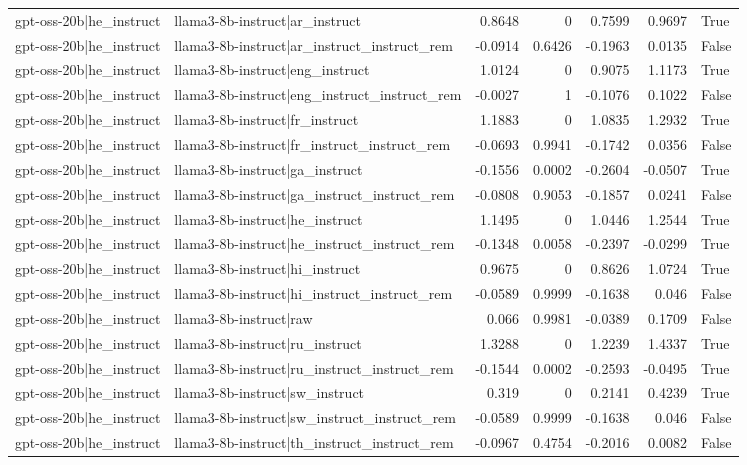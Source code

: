 \begin{table}
\begin{tabular}{l l r r r r l}
gpt-oss-20b|he_instruct & llama3-8b-instruct|ar_instruct & 0.8648 & 0 & 0.7599 & 0.9697 & True \\
gpt-oss-20b|he_instruct & llama3-8b-instruct|ar_instruct_instruct_rem & -0.0914 & 0.6426 & -0.1963 & 0.0135 & False \\
gpt-oss-20b|he_instruct & llama3-8b-instruct|eng_instruct & 1.0124 & 0 & 0.9075 & 1.1173 & True \\
gpt-oss-20b|he_instruct & llama3-8b-instruct|eng_instruct_instruct_rem & -0.0027 & 1 & -0.1076 & 0.1022 & False \\
gpt-oss-20b|he_instruct & llama3-8b-instruct|fr_instruct & 1.1883 & 0 & 1.0835 & 1.2932 & True \\
gpt-oss-20b|he_instruct & llama3-8b-instruct|fr_instruct_instruct_rem & -0.0693 & 0.9941 & -0.1742 & 0.0356 & False \\
gpt-oss-20b|he_instruct & llama3-8b-instruct|ga_instruct & -0.1556 & 0.0002 & -0.2604 & -0.0507 & True \\
gpt-oss-20b|he_instruct & llama3-8b-instruct|ga_instruct_instruct_rem & -0.0808 & 0.9053 & -0.1857 & 0.0241 & False \\
gpt-oss-20b|he_instruct & llama3-8b-instruct|he_instruct & 1.1495 & 0 & 1.0446 & 1.2544 & True \\
gpt-oss-20b|he_instruct & llama3-8b-instruct|he_instruct_instruct_rem & -0.1348 & 0.0058 & -0.2397 & -0.0299 & True \\
gpt-oss-20b|he_instruct & llama3-8b-instruct|hi_instruct & 0.9675 & 0 & 0.8626 & 1.0724 & True \\
gpt-oss-20b|he_instruct & llama3-8b-instruct|hi_instruct_instruct_rem & -0.0589 & 0.9999 & -0.1638 & 0.046 & False \\
gpt-oss-20b|he_instruct & llama3-8b-instruct|raw & 0.066 & 0.9981 & -0.0389 & 0.1709 & False \\
gpt-oss-20b|he_instruct & llama3-8b-instruct|ru_instruct & 1.3288 & 0 & 1.2239 & 1.4337 & True \\
gpt-oss-20b|he_instruct & llama3-8b-instruct|ru_instruct_instruct_rem & -0.1544 & 0.0002 & -0.2593 & -0.0495 & True \\
gpt-oss-20b|he_instruct & llama3-8b-instruct|sw_instruct & 0.319 & 0 & 0.2141 & 0.4239 & True \\
gpt-oss-20b|he_instruct & llama3-8b-instruct|sw_instruct_instruct_rem & -0.0589 & 0.9999 & -0.1638 & 0.046 & False \\
gpt-oss-20b|he_instruct & llama3-8b-instruct|th_instruct_instruct_rem & -0.0967 & 0.4754 & -0.2016 & 0.0082 & False \\

\end{tabular}
\end{table}
